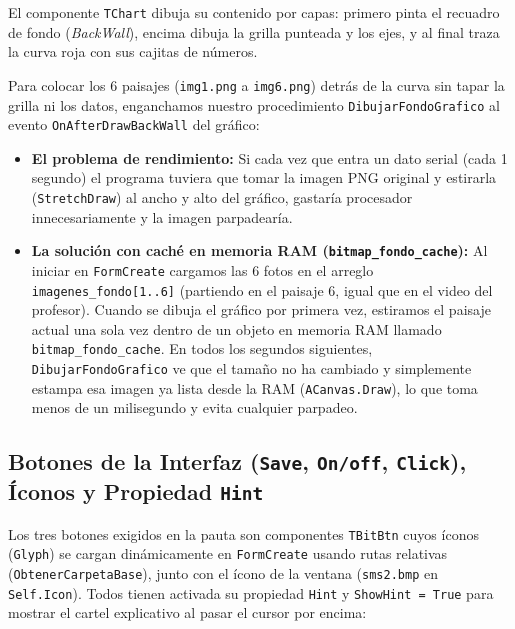 \documentclass[11pt,a4paper]{article}
\begin{document}
El componente \texttt{TChart} dibuja su contenido por capas: primero pinta el recuadro de fondo (\emph{BackWall}), encima dibuja la grilla punteada y los ejes, y al final traza la curva roja con sus cajitas de números.

Para colocar los 6 paisajes (\texttt{img1.png} a \texttt{img6.png}) detrás de la curva sin tapar la grilla ni los datos, enganchamos nuestro procedimiento \texttt{DibujarFondoGrafico} al evento \texttt{OnAfterDrawBackWall} del gráfico:

\begin{itemize}[leftmargin=1.5em, itemsep=0.3em]
    \item \textbf{El problema de rendimiento:} Si cada vez que entra un dato serial (cada 1 segundo) el programa tuviera que tomar la imagen PNG original y estirarla (\texttt{StretchDraw}) al ancho y alto del gráfico, gastaría procesador innecesariamente y la imagen parpadearía.
    \item \textbf{La solución con caché en memoria RAM (\texttt{bitmap\_fondo\_cache}):} Al iniciar en \texttt{FormCreate} cargamos las 6 fotos en el arreglo \texttt{imagenes\_fondo[1..6]} (partiendo en el paisaje 6, igual que en el video del profesor). Cuando se dibuja el gráfico por primera vez, estiramos el paisaje actual una sola vez dentro de un objeto en memoria RAM llamado \texttt{bitmap\_fondo\_cache}. En todos los segundos siguientes, \texttt{DibujarFondoGrafico} ve que el tamaño no ha cambiado y simplemente estampa esa imagen ya lista desde la RAM (\texttt{ACanvas.Draw}), lo que toma menos de un milisegundo y evita cualquier parpadeo.
\end{itemize}

\subsection{Botones de la Interfaz (\texttt{Save}, \texttt{On/off}, \texttt{Click}), Íconos y Propiedad \texttt{Hint}}

Los tres botones exigidos en la pauta son componentes \texttt{TBitBtn} cuyos íconos (\texttt{Glyph}) se cargan dinámicamente en \texttt{FormCreate} usando rutas relativas (\texttt{ObtenerCarpetaBase}), junto con el ícono de la ventana (\texttt{sms2.bmp} en \texttt{Self.Icon}). Todos tienen activada su propiedad \texttt{Hint} y \texttt{ShowHint = True} para mostrar el cartel explicativo al pasar el cursor por encima:
\end{document}
